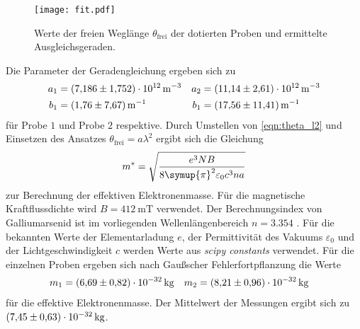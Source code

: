 \begin{figure}
  \centering
  \texttt{[image: fit.pdf]}
  \caption{Werte der freien Weglänge $\theta_\text{frei}$ der dotierten Proben und ermittelte Ausgleichsgeraden.}
  \label{fig:fit}
\end{figure}

Die Parameter der Geradengleichung ergeben sich zu
\begin{align*}
  a_1 &= \qty{7.186+-1.752e12}{\metre^{-3}} &  a_2 &= \qty{11.14+-2.61e12}{\metre^{-3}} \\
  b_1 &= \qty{1.76+-7.67}{\metre^{-1}} & b_1 &= \qty{17.56+-11.41}{\metre^{-1}}
\end{align*}
für Probe $1$ und Probe $2$ respektive. Durch Umstellen von \autoref{eqn:theta_l2} und Einsetzen des Ansatzes $\theta_\text{frei} = a \lambda^2$ ergibt sich 
die Gleichung
\begin{equation}
  m^* = \sqrt{\frac{e^3 N B}{8 \symup{\pi}^2 \varepsilon_0 c^3 n a}}
\end{equation}
zur Berechnung der effektiven Elektronenmasse. Für die magnetische Kraftflussdichte wird $B = \qty{412}{\milli\tesla}$ verwendet. Der Berechnungsindex von Galliumarsenid ist
im vorliegenden Wellenlängenbereich $n = \num{3.354}$ \cite{Brechungsindex_GaAs}. Für die bekannten Werte der Elementarladung $e$, der Permittivität des Vakuums $\varepsilon_0$ und der 
Lichtgeschwindigkeit $c$ werden Werte aus \textit{scipy constants} \cite{scipy} verwendet. Für die einzelnen Proben ergeben sich nach Gaußscher Fehlerfortpflanzung 
die Werte
\begin{align*}
  m_1 &= \qty{6.69+-0.82e-32}{\kilo\gram} & m_2 &=  \qty{8.21+-0.96e-32}{\kilo\gram}
\end{align*}
für die effektive Elektronenmasse. Der Mittelwert der Messungen ergibt sich zu $\qty{7.45+-0.63e-32}{\kilo\gram}$.

